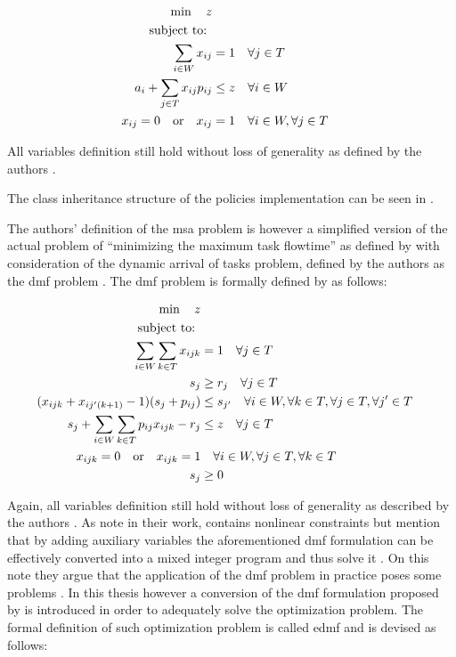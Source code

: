\documentclass[draft=false]{seal_thesis}
\begin{document}
\begin{align}
    \min \quad z\\
    \text{subject to: } \notag \\
    \sum_{i \in W} x_{ij} &= 1 \quad \forall j \in T\\
    a_i + \sum_{j \in T} x_{ij} p_{ij} &\leq z \quad \forall i \in W\\
    x_{ij}=0 \quad \text{or} \quad x_{ij}&=1 \quad \forall i \in W, \forall j \in T
\end{align}

All variables definition still hold without loss of generality as defined by the authors \citep[pp. 5-7]{Zeng2005}.

The class inheritance structure of the policies implementation can be seen in .


The authors' definition of the \gls{msa} problem is however a simplified version of the actual problem of ``minimizing the maximum task flowtime'' as defined by \citet{Baker1974} with consideration of the dynamic arrival of tasks problem, defined by the authors as the \gls{dmf} problem \citep{Zeng2005}. The \gls{dmf} problem is formally defined by \citet{Zeng2005} as follows:

\begin{align}
    \min \quad z\\
    \text{subject to: } \notag \\
    \sum_{i \in W} \sum_{k \in T} x_{ijk} &= 1 \quad \forall j \in T\\
    s_j &\geq r_j \quad \forall j \in T\\
    (x_{ijk} + x_{ij'(k+1)} - 1)(s_j + p_{ij}) &\leq s_{j'} \quad \forall i \in W, \forall k \in T, \forall j \in T, \forall j' \in T \label{eq:nonlinear_constraints_dmf}\\
    s_j + \sum_{i \in W} \sum_{k \in T} p_{ij} x_{ijk} - r_j &\leq z \quad \forall j \in T\\
    x_{ijk} = 0 \quad \text{or} \quad x_{ijk} = 1 &\quad \forall i \in W, \forall j \in T, \forall k \in T\\
    s_j &\geq 0
\end{align}

Again, all variables definition still hold without loss of generality as described by the authors \citep[p. 6]{Zeng2005}. As \citet{Zeng2005} note in their work,  contains nonlinear constraints but mention that by adding auxiliary variables the aforementioned \gls{dmf} formulation can be effectively converted into a mixed integer program and thus solve it \citep[p. 6]{Zeng2005}. On this note they argue that the application of the \gls{dmf} problem in practice poses some problems \citep{Zeng2005}. In this thesis however a conversion of the \gls{dmf} formulation proposed by \citet{Zeng2005} is introduced in order to adequately solve the optimization problem. The formal definition of such optimization problem is called \gls{edmf} and is devised as follows:
\end{document}
